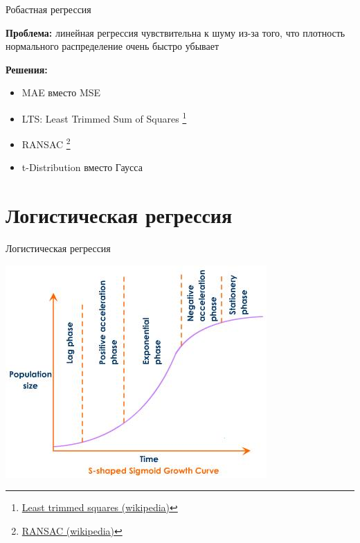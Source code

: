 \documentclass[aspectratio=169]{beamer}
\begin{document}
\begin{frame}{Робастная регрессия}

{\bf Проблема:} линейная регрессия чувствительна к шуму из-за того, что плотность нормального распределение очень быстро убывает

\vspace{1em}
{\bf Решения:}
\begin{itemize}
\item MAE вместо MSE
\item LTS: Least Trimmed Sum of Squares \footnote{\href{https://en.wikipedia.org/wiki/Least_trimmed_squares}{Least trimmed squares (wikipedia)}}
\item RANSAC \footnote{\href{https://en.wikipedia.org/wiki/RANSAC}{RANSAC (wikipedia)}}
\item t-Distribution вместо Гаусса
\end{itemize}

\end{frame}


\section{Логистическая регрессия}


\begin{frame}{}

\begin{center}
\Large Логистическая регрессия

\vspace{1em}
\includegraphics[height=0.7\textheight]{images/sigmoid-growth-curve.jpg}
\end{center}

\end{frame}
\end{document}
